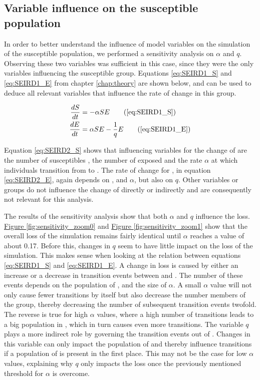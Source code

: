 \subsection{Variable influence on the susceptible population}
In order to better understand the influence of model variables on the simulation of the
susceptible population, we performed a sensitivity analysis on $\alpha$ and $q$.
Observing these two variables was sufficient in this case, since they were the only
variables influencing the susceptible group. Equations \ref{eq:SEIRD1_S} and \ref{eq:SEIRD1_E}
from chapter \ref*{chap:theory} are shown below, and can be used to deduce all relevant variables that influence the rate of
change in this group.

\begin{align*}
	\frac{dS}{dt} &= -\alpha S E \tag{\ref*{eq:SEIRD1_S}} \label{eq:SEIRD2_S}\\
	\frac{dE}{dt} &= \alpha S E -\frac{1}{q} E \tag{\ref*{eq:SEIRD1_E}} \label{eq:SEIRD2_E}
\end{align*}

Equation \ref*{eq:SEIRD2_S} shows that influencing variables for the change of  are the number of susceptibles ,
the number of exposed  and the rate $\alpha$ at which individuals transition from  to . The rate of change for ,
in equation \ref*{eq:SEIRD2_E}, again depends on ,  and $\alpha$, but also on $q$. Other variables or groups do not
influence the change of  directly or indirectly and are consequently not relevant for this analysis. \newline

The results of the sensitivity analysis show
that both $\alpha$ and $q$ influence the loss. \hyperref[fig:sensitivity_zoom0]{Figure \ref*{fig:sensitivity_zoom0}} and
\hyperref[fig:sensitivity_zoom1]{Figure \ref*{fig:sensitivity_zoom1}} show
that the overall loss of the simulation remains fairly identical until $\alpha$ reaches a value of about 0.17. Before this,
changes in $q$ seem to have little impact on the loss of the simulation. This makes sense when looking at the relation between
equations \ref*{eq:SEIRD1_S} and \ref*{eq:SEIRD1_E}. A change in loss is caused by either an increase or a decrease in transition events
between  and . The number of these events depends on the population of ,  and the size of $\alpha$.
A small $\alpha$ value will not only cause fewer transitions by itself but also decrease the number members of the  group, thereby 
decreasing the number of subsequent transition events twofold. The reverse is true for high $\alpha$ values, where a high
number of transitions leads to a big population in , which in turn causes even more transitions.
The variable $q$ plays a more indirect role by governing the transition events out of . Changes in this variable
can only impact the population of  and thereby influence  transitions if a population of  is present in
the first place. This may not be the case for low $\alpha$ values, explaining why $q$ only impacts the loss once the
previously mentioned threshold for $\alpha$ is overcome.\newline

